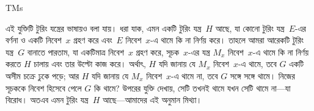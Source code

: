 \documentclass[../../../include/open-logic-section]{subfiles}
\begin{document}
\begin{tagblock}{TMs}
\begin{explain}
এই যুক্তিটি টুরিং যন্ত্রের ভাষায়ও বলা যায়। ধরা যাক, এমন একটি টুরিং
যন্ত্র~$H$ আছে, যা কোনো টুরিং যন্ত্র~$E$-এর বর্ণনা ও একটি নিবেশ~$x$
গ্রহণ করে এবং~$E$ নিবেশ~$x$-এ থামে কি না নির্ণয় করে। তাহলে আমরা আরেকটি
টুরিং যন্ত্র~$G$ বানাতে পারতাম, যা একটিমাত্র নিবেশ~$x$ গ্রহণ করে, সূচক~$x$-এর
যন্ত্র $M_x$ নিবেশ~$x$-এ থামে কি না নির্ণয় করতে $H$ চালায় এবং তার
উল্টো কাজ করে। অর্থাৎ, $H$ যদি জানায় যে $M_x$ নিবেশ~$x$-এ থামে, তবে
$G$ একটি অসীম চক্রে ঢুকে পড়ে; আর $H$ যদি জানায় যে $M_x$ নিবেশ~$x$-এ
থামে না, তবে $G$ সঙ্গে সঙ্গে থামে। নিজের সূচককে নিবেশ হিসেবে পেলে $G$
কি থামে? উপরের যুক্তি দেখায়, সেটি তখনই থামে যখন সেটি থামে না—যা বিরোধ।
অতএব এমন টুরিং যন্ত্র~$H$ আছে—আমাদের এই অনুমান মিথ্যা।
\end{explain}
\end{tagblock}
\end{document}
